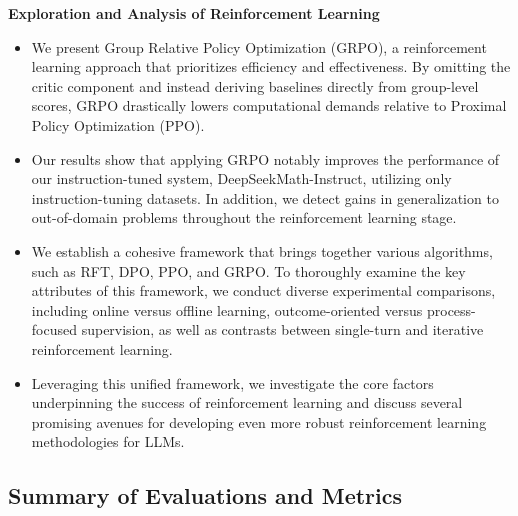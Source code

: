 \textbf{Exploration and Analysis of Reinforcement Learning}

\begin{itemize}[topsep=0pt]
    \item We present Group Relative Policy Optimization (GRPO), a reinforcement learning approach that prioritizes efficiency and effectiveness. By omitting the critic component and instead deriving baselines directly from group-level scores, GRPO drastically lowers computational demands relative to Proximal Policy Optimization (PPO).
    \item Our results show that applying GRPO notably improves the performance of our instruction-tuned system, DeepSeekMath-Instruct, utilizing only instruction-tuning datasets. In addition, we detect gains in generalization to out-of-domain problems throughout the reinforcement learning stage.
    \item We establish a cohesive framework that brings together various algorithms, such as RFT, DPO, PPO, and GRPO. To thoroughly examine the key attributes of this framework, we conduct diverse experimental comparisons, including online versus offline learning, outcome-oriented versus process-focused supervision, as well as contrasts between single-turn and iterative reinforcement learning.
    \item Leveraging this unified framework, we investigate the core factors underpinning the success of reinforcement learning and discuss several promising avenues for developing even more robust reinforcement learning methodologies for LLMs.
\end{itemize}

\subsection{Summary of Evaluations and Metrics}

